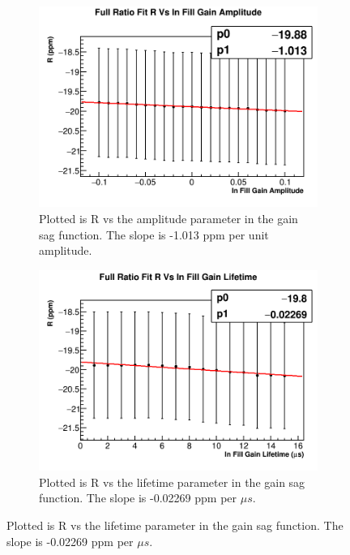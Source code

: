 		\begin{figure}[]
		\centering
		    \begin{subfigure}[t]{0.45\textwidth}
			    \centering
				\includegraphics[width=\textwidth]{RatioCBO_R_Vs_InFillGainAmplitude_Canv}
			    \caption{Plotted is R vs the amplitude parameter in the gain sag function. The slope is -1.013 ppm per unit amplitude.}
		    \end{subfigure}
		    \hspace{4mm}
		    \begin{subfigure}[t]{0.45\textwidth}
			    \centering
				\includegraphics[width=\textwidth]{RatioCBO_R_Vs_InFillGainLifetime_Canv}
			    \caption{Plotted is R vs the lifetime parameter in the gain sag function. The slope is -0.02269 ppm per $\mu s$.}
		    \end{subfigure}%

\end{figure}
